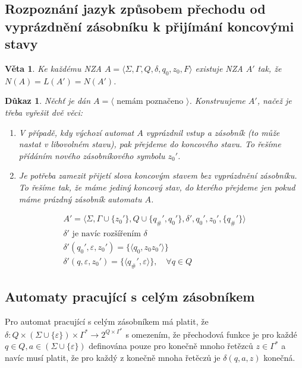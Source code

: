 \documentclass[10pt, a4paper, titlepage]{article}
\theoremstyle{note}
\newtheorem{veta}{\textbf{Věta}}
\newtheorem{dukaz}{\textbf{Důkaz}}
\begin{document}
\subsection{Rozpoznání jazyk způsobem přechodu od vyprázdnění zásobníku k přijímání koncovými stavy}
\begin{veta}
Ke každému NZA $A = \langle \Sigma, \Gamma, Q, \delta, q_0, z_0, F \rangle$ existuje NZA $A'$ tak, že $N(A) = L(A') = N(A')$.
\end{veta}
\begin{dukaz}
Něchť je dán $A = \langle \text{ nemám poznačeno } \rangle$. Konstruujeme $A'$, načež je třeba vyřešit dvě věci:
\begin{enumerate}
\item
V případě, kdy výchozí automat $A$ vyprázdnil vstup a zásobník (to může nastat v libovolném stavu), pak přejdeme do koncového
stavu. To řešíme přídáním nového zásobníkového symbolu $z_0'$.

\item
Je potřeba zamezit přijetí slova koncovým stavem bez vyprázdnění zásobníku. To řešíme tak, že máme jediný koncový stav, do kterého přejdeme
jen pokud máme prázdný zásobník automatu $A$.
\end{enumerate}
\begin{gather*}
A' = \langle \Sigma, \Gamma \cup \lbrace z_0' \rbrace, Q \cup \lbrace q_\#', q_0' \rbrace, \delta', q_0', z_0', \lbrace q_\#' \rbrace \rangle \\
\delta' \text{ je navíc rozšířením } \delta \\
\delta'(q_0', \varepsilon, z_0') = \lbrace \langle q_0, z_0z_0' \rangle \rbrace \\
\delta'(q, \varepsilon, z_0') = \lbrace \langle q_\#', \varepsilon \rangle \rbrace, \quad \forall q \in Q
\end{gather*}
\end{dukaz}

\subsection{Automaty pracující s celým zásobníkem}
Pro automat pracující s celým zásobníkem má platit, že $\delta : Q \times (\Sigma \cup \lbrace \varepsilon \rbrace) \times \Gamma^*
 \rightarrow 2^{Q \times \Gamma^*}$ s omezením, že přechodová funkce je pro každé $q \in Q, a \in (\Sigma \cup \lbrace \varepsilon \rbrace)$ definována
pouze pro konečně mnoho řetězců $z \in \Gamma^*$ a navíc musí platit, že pro každý z konečně mnoha řetěczů je $\delta(q, a, z)$ konečná.
\end{document}
